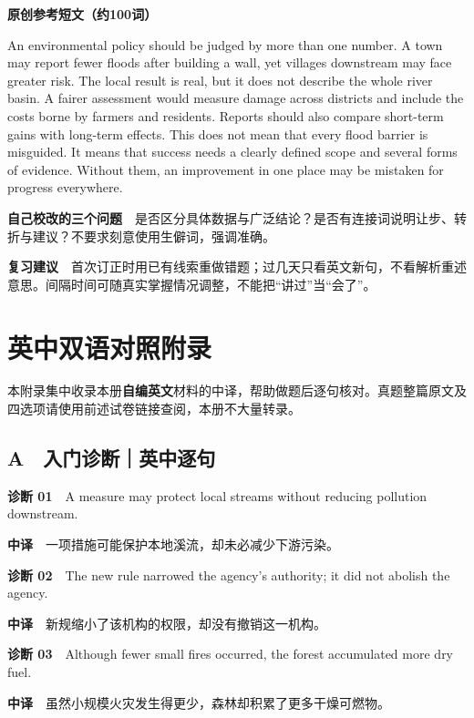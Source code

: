 \documentclass[
  11pt,
]{ctexart}
\begin{document}
\textbf{原创参考短文（约100词）}

An environmental policy should be judged by more than one number. A town
may report fewer floods after building a wall, yet villages downstream
may face greater risk. The local result is real, but it does not
describe the whole river basin. A fairer assessment would measure damage
across districts and include the costs borne by farmers and residents.
Reports should also compare short-term gains with long-term effects.
This does not mean that every flood barrier is misguided. It means that
success needs a clearly defined scope and several forms of evidence.
Without them, an improvement in one place may be mistaken for progress
everywhere.

\textbf{自己校改的三个问题}　是否区分具体数据与广泛结论？是否有连接词说明让步、转折与建议？不要求刻意使用生僻词，强调准确。

\textbf{复习建议}　首次订正时用已有线索重做错题；过几天只看英文新句，不看解析重述意思。间隔时间可随真实掌握情况调整，不能把``讲过''当``会了''。

\clearpage

\section{英中双语对照附录}\label{ux82f1ux4e2dux53ccux8bedux5bf9ux7167ux9644ux5f55}

本附录集中收录本册\textbf{自编英文}材料的中译，帮助做题后逐句核对。真题整篇原文及四选项请使用前述试卷链接查阅，本册不大量转录。

\subsection{A　入门诊断｜英中逐句}\label{a-ux5165ux95e8ux8bcaux65adux82f1ux4e2dux9010ux53e5}

\textbf{诊断 01}　A measure may protect local streams without reducing
pollution downstream.

\textbf{中译}　一项措施可能保护本地溪流，却未必减少下游污染。

\textbf{诊断 02}　The new rule narrowed the agency's authority; it did
not abolish the agency.

\textbf{中译}　新规缩小了该机构的权限，却没有撤销这一机构。

\textbf{诊断 03}　Although fewer small fires occurred, the forest
accumulated more dry fuel.

\textbf{中译}　虽然小规模火灾发生得更少，森林却积累了更多干燥可燃物。
\end{document}
